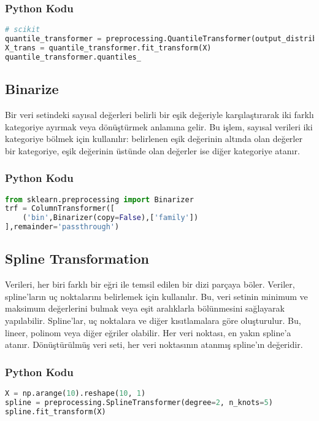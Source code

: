 \subsubsection{Python Kodu}

\begin{lstlisting}[language=Python]
# scikit
quantile_transformer = preprocessing.QuantileTransformer(output_distribution='normal', random_state=0)
X_trans = quantile_transformer.fit_transform(X)
quantile_transformer.quantiles_
\end{lstlisting}

\subsection{Binarize}
Bir veri setindeki sayısal değerleri belirli bir eşik değeriyle karşılaştırarak iki farklı kategoriye ayırmak veya dönüştürmek anlamına gelir. Bu işlem, sayısal verileri iki kategoriye bölmek için kullanılır: belirlenen eşik değerinin altında olan değerler bir kategoriye, eşik değerinin üstünde olan değerler ise diğer kategoriye atanır.

\subsubsection{Python Kodu}

\begin{lstlisting}[language=Python]
from sklearn.preprocessing import Binarizer
trf = ColumnTransformer([
    ('bin',Binarizer(copy=False),['family'])
],remainder='passthrough')
\end{lstlisting}

\subsection{Spline Transformation}
Verileri, her biri farklı bir eğri ile temsil edilen bir dizi parçaya böler. Veriler, spline'ların uç noktalarını belirlemek için kullanılır. Bu, veri setinin minimum ve maksimum değerlerini bulmak veya eşit aralıklarla bölünmesini sağlayarak yapılabilir. Spline'lar, uç noktalara ve diğer kısıtlamalara göre oluşturulur. Bu, lineer, polinom veya diğer eğriler olabilir. Her veri noktası, en yakın spline'a atanır. Dönüştürülmüş veri seti, her veri noktasının atanmış spline'ın değeridir.

\subsubsection{Python Kodu}

\begin{lstlisting}[language=Python]
X = np.arange(10).reshape(10, 1)
spline = preprocessing.SplineTransformer(degree=2, n_knots=5)
spline.fit_transform(X)
\end{lstlisting}

\newpage